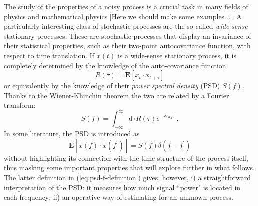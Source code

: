 \documentclass[twocolumn,showpacs,preprintnumbers,nofootinbib,prd,
superscriptaddress,10pt]{revtex4-1}
\begin{document}
The study of the properties of a noisy process is a crucial task in many fields of physics and mathematical physics [Here we should make some examples...].
A particularly interesting class of stochastic processes are the so-called \textit{wide-sense} stationary processes. These are stochastic processes that display an invariance of their statistical properties, such as their two-point autocovariance function, with respect to time translation. If $x(t)$ is a wide-sense stationary process, it is completely determined by the knowledge of the auto-covariance function 
\begin{equation}
	R(\tau) = \mathbf{E}[x_t \cdot x_{t+\tau}]
\end{equation}
or equivalently by the knowledge of their \emph{power spectral density} (PSD) $S(f)$. Thanks to the Wiener-Khinchin theorem the two are related by a Fourier transform: 
\begin{equation}
	S(f) = \int_{-\infty}^{\infty} \textrm{d}\tau R(\tau) e^{-i 2 \pi f \tau}\,.
\end{equation}
In some literature, the PSD is introduced as  
\begin{equation}\label{eq:psd-f-definition}
	\mathbf{E}[\tilde{x}(f) \cdot \tilde{x}(f^\prime)] = S(f) \delta(f-f^\prime)
\end{equation}
without highlighting its connection with the time structure of the process itself, thus masking some important properties that will explore further in what follows. The latter definition in (\ref{eq:psd-f-definition}) gives, however, i) a straightforward interpretation of the PSD: it measures how much signal ``power" is located in each frequency; ii) an operative way of estimating for an unknown process.  
\end{document}
